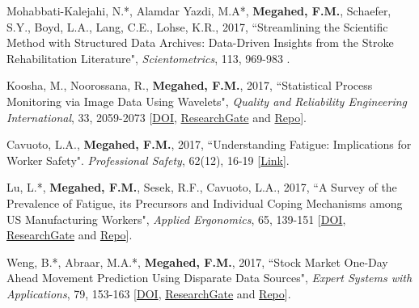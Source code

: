 \documentclass[margin,line]{res}
\begin{document}
\begin{resume}
\vspace{-1.5mm}
Mohabbati-Kalejahi, N.*, Alamdar Yazdi, M.A*, \textbf{Megahed, F.M.}, Schaefer, S.Y., Boyd, L.A., Lang, C.E., Lohse, K.R., 2017, ``Streamlining the Scientific Method with Structured Data Archives: Data-Driven Insights from the Stroke Rehabilitation Literature", \textit{Scientometrics}, 113, 969-983 .

\vspace{-1.5mm}
Koosha, M., Noorossana, R., \textbf{Megahed, F.M.}, 2017, ``Statistical Process Monitoring via Image Data Using Wavelets", \textit{Quality and Reliability Engineering International}, 33, 2059-2073 [\faFile*\href{https://doi.org/10.1002/qre.2167}{DOI}, \faResearchgate \href{https://www.researchgate.net/publication/318709095_Statistical_process_monitoring_via_image_data_using_wavelets}{ResearchGate} and \faGithub \href{https://github.com/mehdikoosha/SPC-image-data-wavelets}{Repo}].

\vspace{-1.5mm}
Cavuoto, L.A., \textbf{Megahed, F.M.}, 2017, ``Understanding Fatigue: Implications for Worker Safety". \textit{Professional Safety}, 62(12), 16-19 [\faFile*\href{https://www.onepetro.org/conference-paper/ASSE-16-734}{Link}].

\vspace{-1.5mm}
Lu, L.*, \textbf{Megahed, F.M.}, Sesek, R.F., Cavuoto, L.A., 2017, ``A Survey of the Prevalence of Fatigue, its Precursors and Individual Coping Mechanisms among US Manufacturing Workers", \textit{Applied Ergonomics}, 65, 139-151 [\faFile*\href{https://doi.org/10.1016/j.apergo.2017.06.004}{DOI}, \faResearchgate \href{https://www.researchgate.net/publication/317718911_A_survey_of_the_prevalence_of_fatigue_its_precursors_and_individual_coping_mechanisms_among_US_manufacturing_workers}{ResearchGate} and \faGithub \href{https://github.com/Michelle170/Fatigue-Survey-among-US-Manufacturing-Workers}{Repo}].

\vspace{-1.5mm}
Weng, B.*, Abraar, M.A.*, \textbf{Megahed, F.M.}, 2017, ``Stock Market One-Day Ahead Movement Prediction Using Disparate Data Sources", \textit{Expert Systems with Applications}, 79, 153-163 [\faFile*\href{https://doi.org/10.1016/j.eswa.2017.02.041}{DOI}, \faResearchgate \href{https://www.researchgate.net/publication/314132532_Stock_Market_One-Day_Ahead_Movement_Prediction_Using_Disparate_Data_Sources}{ResearchGate} and \faGithub \href{https://github.com/binweng/ShinyStock}{Repo}].


\end{resume}
\end{document}
